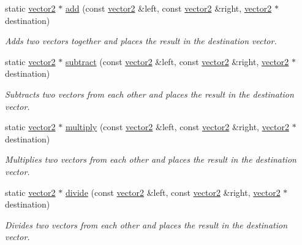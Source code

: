 \begin{DoxyCompactItemize}
\item 
static \hyperlink{classflounder_1_1vector2}{vector2} $\ast$ \hyperlink{classflounder_1_1vector2_a9ceb1174209a855837e8d8b562fc0ed2}{add} (const \hyperlink{classflounder_1_1vector2}{vector2} \&left, const \hyperlink{classflounder_1_1vector2}{vector2} \&right, \hyperlink{classflounder_1_1vector2}{vector2} $\ast$destination)
\begin{DoxyCompactList}\small\item\em Adds two vectors together and places the result in the destination vector. \end{DoxyCompactList}\item 
static \hyperlink{classflounder_1_1vector2}{vector2} $\ast$ \hyperlink{classflounder_1_1vector2_a5ac1c454a401a063e3324df295b8b8ae}{subtract} (const \hyperlink{classflounder_1_1vector2}{vector2} \&left, const \hyperlink{classflounder_1_1vector2}{vector2} \&right, \hyperlink{classflounder_1_1vector2}{vector2} $\ast$destination)
\begin{DoxyCompactList}\small\item\em Subtracts two vectors from each other and places the result in the destination vector. \end{DoxyCompactList}\item 
static \hyperlink{classflounder_1_1vector2}{vector2} $\ast$ \hyperlink{classflounder_1_1vector2_a0941a18b5dac20f6c7fa6a33773ec3bf}{multiply} (const \hyperlink{classflounder_1_1vector2}{vector2} \&left, const \hyperlink{classflounder_1_1vector2}{vector2} \&right, \hyperlink{classflounder_1_1vector2}{vector2} $\ast$destination)
\begin{DoxyCompactList}\small\item\em Multiplies two vectors from each other and places the result in the destination vector. \end{DoxyCompactList}\item 
static \hyperlink{classflounder_1_1vector2}{vector2} $\ast$ \hyperlink{classflounder_1_1vector2_a6fd7416726d39deaba2abacd9b094984}{divide} (const \hyperlink{classflounder_1_1vector2}{vector2} \&left, const \hyperlink{classflounder_1_1vector2}{vector2} \&right, \hyperlink{classflounder_1_1vector2}{vector2} $\ast$destination)
\begin{DoxyCompactList}\small\item\em Divides two vectors from each other and places the result in the destination vector. \end{DoxyCompactList}\item 

\end{DoxyCompactItemize}
